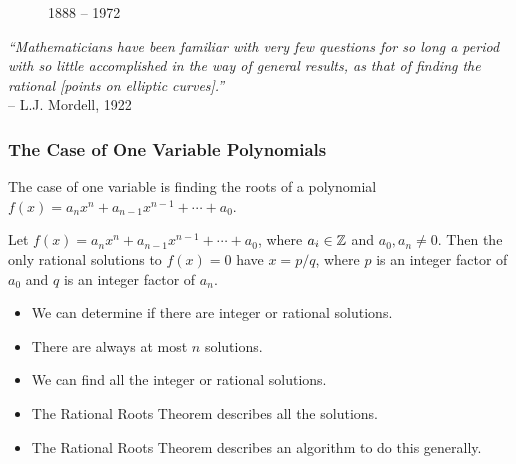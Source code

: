 {\begin{frame}[plain]
\begin{minipage}{0.18\textwidth}
\begin{figure}[h]
	{\small 1888 -- 1972}
	\end{figure}
	\end{minipage} \hspace{0.2cm} \begin{minipage}{0.76\textwidth}
	\begin{center} \phantom{.} \par \phantom{.} \par
	{\itshape ``Mathematicians have been familiar with very few questions for so long a period with so little accomplished in the way of general results, as that of finding the rational [points on elliptic curves].''} \\
	 \phantom{x}\hfill-- L.J. Mordell, 1922
	\end{center}
 	\end{minipage}
\end{frame}
}



\begin{frame}[plain] \frametitle{The Case of One Variable Polynomials}
The case of one variable is finding the roots of a polynomial $f(x)= a_n x^n + a_{n-1} x^{n-1} + \cdots + a_0$.

\begin{thm}
Let $f(x)= a_n x^n + a_{n-1} x^{n-1} + \cdots + a_0$, where $a_i \in \mathbb{Z}$ and $a_0,a_n \neq 0$. Then the only rational solutions to $f(x)=0$ have $x= p/q$, where $p$ is an integer factor of $a_0$ and $q$ is an integer factor of $a_n$. 
\end{thm}

\begin{itemize}
\item We can determine if there are integer or rational solutions.
\item There are always at most $n$ solutions.
\item We can find all the integer or rational solutions.
\item The Rational Roots Theorem describes all the solutions.
\item The Rational Roots Theorem describes an algorithm to do this generally. 
\end{itemize}
\end{frame}



